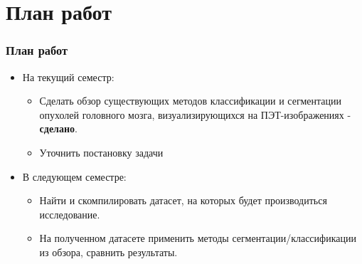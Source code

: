 
\section{План работ}
\begin{frame}
    \frametitle{План работ}
    \begin{itemize}
        \item На текущий семестр:
            \begin{itemize}
                \item Сделать обзор существующих методов классификации и сегментации опухолей головного мозга,
                визуализирующихся на ПЭТ-изображениях - \textbf{сделано}.
                \item Уточнить постановку задачи
            \end{itemize}
        \item В следующем семестре:
            \begin{itemize}
                \item Найти и скомпилировать датасет, на которых будет производиться исследование.
                \item На полученном датасете применить методы сегментации/классификации из обзора, 
                сравнить результаты.
            \end{itemize}
    \end{itemize}
\end{frame}

\begin{frame}
    \begin{center}
    \end{center}
\end{frame}